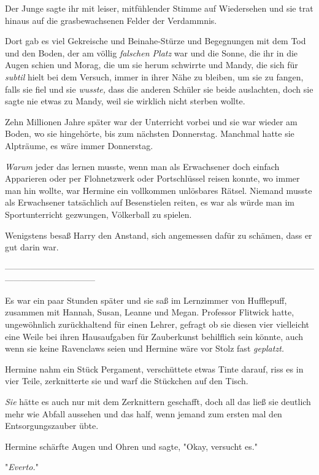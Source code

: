 {Der Junge sagte ihr mit leiser, mitfühlender Stimme auf Wiedersehen und sie trat hinaus auf die grasbewachsenen Felder der Verdammnis.

Dort gab es viel Gekreische und Beinahe-Stürze und Begegnungen mit dem Tod und den Boden, der am völlig \emph{falschen Platz} war und die Sonne, die ihr in die Augen schien und Morag, die um sie herum schwirrte und Mandy, die sich für \emph{subtil} hielt bei dem Versuch, immer in ihrer Nähe zu bleiben, um sie zu fangen, falls sie fiel und sie \emph{wusste,} dass die anderen Schüler sie beide auslachten, doch sie sagte nie etwas zu Mandy, weil sie wirklich nicht sterben wollte.

Zehn Millionen Jahre später war der Unterricht vorbei und sie war wieder am Boden, wo sie hingehörte, bis zum nächsten Donnerstag. Manchmal hatte sie Alpträume, es wäre immer Donnerstag.

\emph{Warum} jeder das lernen musste, wenn man als Erwachsener doch einfach Apparieren oder per Flohnetzwerk oder Portschlüssel reisen konnte, wo immer man hin wollte, war Hermine ein vollkommen unlösbares Rätsel. Niemand musste als Erwachsener tatsächlich auf Besenstielen reiten, es war als würde man im Sportunterricht gezwungen, Völkerball zu spielen.

Wenigstens besaß Harry den Anstand, sich angemessen dafür zu schämen, dass er gut darin war.

--------------------------------------------------------------------------------------------------------------------------------------------

Es war ein paar Stunden später und sie saß im Lernzimmer von Hufflepuff, zusammen mit Hannah, Susan, Leanne und Megan. Professor Flitwick hatte, ungewöhnlich zurückhaltend für einen Lehrer, gefragt ob sie diesen vier vielleicht eine Weile bei ihren Hausaufgaben für Zauberkunst behilflich sein könnte, auch wenn sie keine Ravenclaws seien und Hermine wäre vor Stolz fast \emph{geplatzt.}

Hermine nahm ein Stück Pergament, verschüttete etwas Tinte darauf, riss es in vier Teile, zerknitterte sie und warf die Stückchen auf den Tisch.

\emph{Sie} hätte es auch nur mit dem Zerknittern geschafft, doch all das ließ sie deutlich mehr wie Abfall aussehen und das half, wenn jemand zum ersten mal den Entsorgungszauber übte.

Hermine schärfte Augen und Ohren und sagte, "Okay, versucht es."

"\emph{Everto.}"

}

